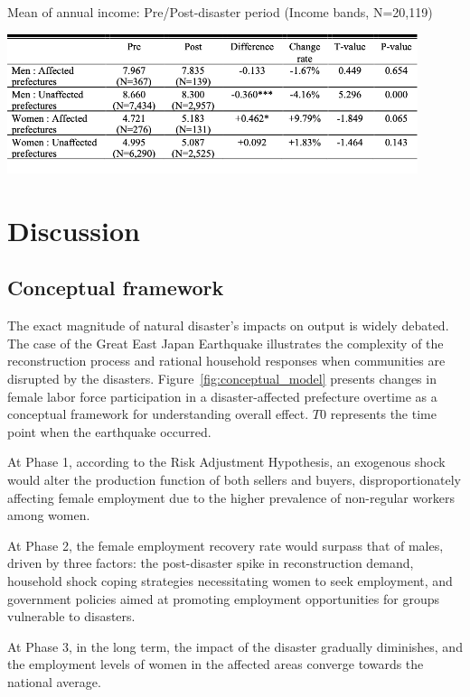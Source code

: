 \documentclass[a4paper,12pt]{article}
\begin{document}
\begin{table}[h!]
    \centering
    \caption{Mean of annual income: Pre/Post-disaster period (Income bands, N=20,119)}
    \label{tab:annual_income}
    \includegraphics[width=0.9\textwidth]{Annual income table.png}  %
    \label{table:mean_of_annual_income}
\end{table}

\newpage

\section{Discussion}
\label{sec5}

\subsection{Conceptual framework}
\label{sec5.1}

The exact magnitude of natural disaster's impacts on output is widely debated. The case of the Great East Japan Earthquake illustrates the complexity of the reconstruction process and rational household responses when communities are disrupted by the disasters. Figure~\ref{fig:conceptual_model} presents changes in female labor force participation in a disaster-affected prefecture overtime as a conceptual framework for understanding overall effect. $T0$ represents the time point when the earthquake occurred. 

At Phase 1, according to the Risk Adjustment Hypothesis, an exogenous shock would alter the production function of both sellers and buyers, disproportionately affecting female employment due to the higher prevalence of non-regular workers among women.

At Phase 2, the female employment recovery rate would surpass that of males, driven by three factors: the post-disaster spike in reconstruction demand, household shock coping strategies necessitating women to seek employment, and government policies aimed at promoting employment opportunities for groups vulnerable to disasters.

At Phase 3, in the long term, the impact of the disaster gradually diminishes, and the employment levels of women in the affected areas converge towards the national average.
\end{document}
